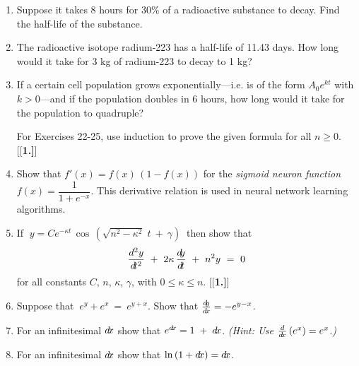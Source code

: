 {\begin{enumerate}[\bfseries 1.]
\begin{multicols}{4}
\end{multicols}
[{[\bfseries 1.]}]
 \item Suppose it takes 8 hours for 30\% of a radioactive substance to decay.
  Find the half-life of the substance.
 \item The radioactive isotope radium-223 has a half-life of 11.43 days. How
  long would it take for 3 kg of radium-223 to decay to 1 kg?
 \item If a certain cell population grows exponentially---i.e. is of the form
  $A_0e^{kt}$ with $k>0$---and if the population doubles in 6 hours, how long
 would it take for the population to quadruple?
\par\noindent For Exercises 22-25, use induction to prove the given formula for all $n \ge 0$.
[{[\bfseries 1.]}]
\item Show that $f'(x) = f(x)\,(1 - f(x))$ for the
\emph{sigmoid neuron function}
$f(x) = \dfrac{1}{1 + e^{-x}}$. This derivative relation is used in neural network learning
algorithms.
\item If $\;y = C e^{-\kappa t}\,\cos\,\left(\sqrt{n^2 - \kappa^2}\;t ~+~ \gamma\right)~$ then
 show that
 \begin{displaymath}
  \frac{d^2y}{d\!t^2} ~+~ 2\kappa\,\frac{d\negmedspace y}{d\!t} ~+~ n^2 y ~=~ 0
 \end{displaymath}
 for all constants $C$, $n$, $\kappa$, $\gamma$, with $0 \le \kappa \le n$.
[{[\bfseries 1.]}]
 \item Suppose that $~e^y + e^x ~=~ e^{y + x}$. Show that $\frac{d\negmedspace y}{d\!x} = -e^{y-x}$.
 \item\label{exer:expdx} For an infinitesimal $d\!x$ show that
  $e^{d\!x} = 1 \;+\; d\!x$. \emph{(Hint: Use $\frac{d}{d\!x}\,(e^x) = e^x$.)}
 \item For an infinitesimal $d\!x$ show that $\ln\,(1 + d\!x) = d\!x$.
\end{enumerate}}
\newpage
